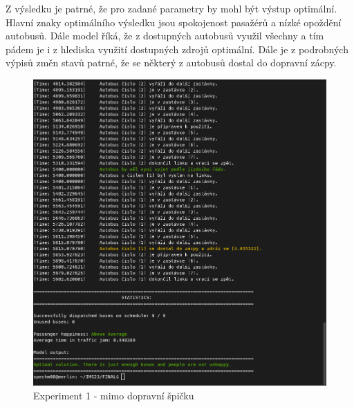 \documentclass[a4paper]{article}
\begin{document}
                \begin{table}[H]
                    \centering
                    \caption{Výsledek experimentu 1}
                    \label{tab:experiment1}
                \end{table}

				Z výsledku je patrné, že pro zadané parametry by mohl být výstup optimální. Hlavní znaky optimálního výsledku jsou spokojenost pasažérů a nízké opoždění autobusů. Dále model říká, že z dostupných autobusů využil všechny a tím pádem je i z hlediska využití dostupných zdrojů optimální. Dále je z podrobných výpisů změn stavů patrné, že se některý z autobusů dostal do dopravní zácpy.

                \begin{figure}[H]
                \includegraphics[scale=0.45, keepaspectratio]{fig/ims_bus1.png}
                \caption{Experiment 1 - mimo dopravní špičku}
                \label{fig:experiment1}
            \end{figure}
        \newpage
\end{document}
